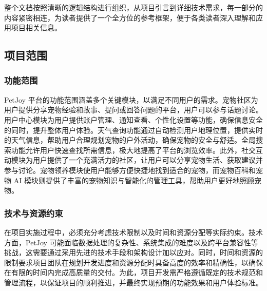 整个文档按照清晰的逻辑结构进行组织，从项目引言到详细技术需求，每一部分的内容紧密相连，为读者提供了一个全方位的参考框架，便于各类读者深入理解和应用项目相关信息。

\subsection{项目范围}

\subsubsection{功能范围}

PetJoy 平台的功能范围涵盖多个关键模块，以满足不同用户的需求。宠物社区为用户提供分享宠物经验和故事、提问或回答问题的平台，用户可以参与话题讨论。用户中心模块为用户提供账户管理、通知查看、个性化设置等功能，确保信息安全的同时，提升整体用户体验。天气查询功能通过自动检测用户地理位置，提供实时的天气信息，帮助用户合理规划宠物的户外活动，确保宠物的安全与舒适。全局搜索功能允许用户快速查找所需信息，极大地提高了平台的浏览效率。此外，社交互动模块为用户提供了一个充满活力的社区，让用户可以分享宠物生活、获取建议并参与讨论。宠物领养模块使用户能够方便快捷地找到适合的宠物，而宠物百科和宠物 AI 模块则提供了丰富的宠物知识与智能化的管理工具，帮助用户更好地照顾宠物。

\subsubsection{技术与资源约束}

在项目实施过程中，必须充分考虑技术限制以及时间和资源分配等实际约束。技术方面，PetJoy 可能面临数据处理的复杂性、系统集成的难度以及跨平台兼容性等挑战，这需要通过采用先进的技术手段和架构设计加以应对。同时，时间和资源的限制要求项目团队在规划开发进度和资源分配时具备高度的效率和精确性，以确保在有限的时间内完成高质量的交付。为此，项目开发需严格遵循既定的技术规范和管理流程，以保证项目的顺利推进，并最终实现预期的功能效果和用户体验标准。


